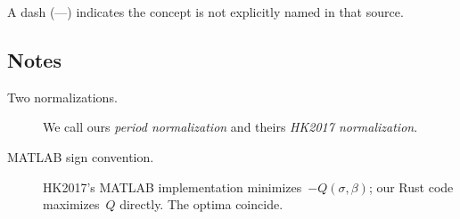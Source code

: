 A dash (---) indicates the concept is not explicitly named in that source.


\subsection{Notes}\label{subsec:notes}

\begin{description}

\item[Two normalizations.]
  We call ours \emph{period normalization} and theirs \emph{HK2017 normalization}.

\item[MATLAB sign convention.]
  HK2017's MATLAB implementation minimizes~$-Q(\sigma,\beta)$; our Rust code maximizes~$Q$ directly. The optima coincide.

\end{description}
